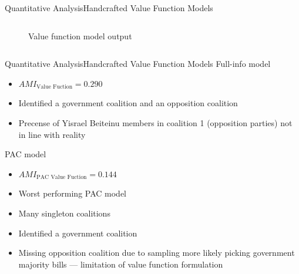 \documentclass[xcolor=dvipsnames]{beamer}
\newcommand{\AMI}{\mathit{AMI}}
\begin{document}
\begin{frame}{Quantitative Analysis}{Handcrafted Value Function Models}
\begin{columns}
\begin{figure}
    \caption{Value function model output}
  \end{figure}
  \end{columns}
\end{frame}

\begin{frame}{Quantitative Analysis}{Handcrafted Value Function Models}
  Full-info model
  \begin{itemize}
    \item $\AMI_{\text{Value Fuction}} = 0.290$
    \item Identified a government coalition and an opposition coalition
    \item Precense of Yisrael Beiteinu members in coalition 1 (opposition parties) not in line with reality
  \end{itemize}
  PAC model
  \begin{itemize}
    \item $\AMI_{\text{PAC Value Fuction}} = 0.144$
    \item Worst performing PAC model
    \item Many singleton coalitions
    \item Identified a government coalition
    \item Missing opposition coalition due to sampling more likely picking government majority bills --- limitation of value function formulation
  \end{itemize}
\end{frame}
\end{document}
